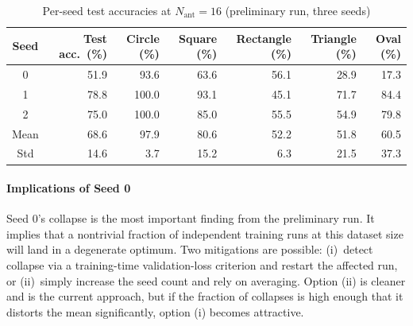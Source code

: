 \documentclass[letterpaper,11pt,leqno]{article}
\begin{document}
\begin{table}[t]
\caption{Per-seed test accuracies at $N_{\mathrm{ant}}=16$ (preliminary run, three seeds)}
\begin{tabular*}{\textwidth}[]{c@{\extracolsep\fill}rrrrrr}
\toprule
Seed & Test acc.\ (\%) & Circle (\%) & Square (\%) & Rectangle (\%) & Triangle (\%) & Oval (\%) \\
\midrule
0    & 51.9            & 93.6        & 63.6        & 56.1           & 28.9          & 17.3      \\
1    & 78.8            & 100.0       & 93.1        & 45.1           & 71.7          & 84.4      \\
2    & 75.0            & 100.0       & 85.0        & 55.5           & 54.9          & 79.8      \\
\midrule
Mean & 68.6            & 97.9        & 80.6        & 52.2           & 51.8          & 60.5      \\
Std  & 14.6            & 3.7         & 15.2        & 6.3            & 21.5          & 37.3      \\
\bottomrule
\end{tabular*}
\label{t:per_seed}\end{table}

\paragraph{Implications of Seed 0} Seed 0's collapse is the most important finding from the preliminary run. It implies that a nontrivial fraction of independent training runs at this dataset size will land in a degenerate optimum. Two mitigations are possible: (i)~detect collapse via a training-time validation-loss criterion and restart the affected run, or (ii)~simply increase the seed count and rely on averaging. Option (ii) is cleaner and is the current approach, but if the fraction of collapses is high enough that it distorts the mean significantly, option (i) becomes attractive.

\end{document}
